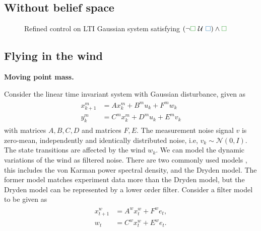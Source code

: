 \documentclass{ifacconf}
\newcommand{\red}[1]{{\color{red} #1}}
\begin{document}
\subsection{Without belief space}
\begin{figure}
	
	\caption{\red{Refined control on LTI Gaussian system satisfying $(\neg {\color{color2}\square } \Until {\color{color0}\square }) \wedge {\color{color2}\square } $ }}
\end{figure}
\subsection{Flying in the wind}
\noindent\textbf{Moving point mass.}
    
Consider the linear time invariant system with Gaussian disturbance, given as 
\begin{align}\begin{aligned}
	x^m_{k+1} &= A x^m_{k}+B^mu_{k}+ F^m w_{k}\\
	y^m_{k}&=C^m x^m_{k}+D^m u_{k}+E^m v_{k}\end{aligned}
\end{align}
with matrices $A,B,C,D$ and matrices $F,E$. 
The measurement noise signal $v$ is zero-mean, independently and identically  distributed noise, i.e, $v_k\sim \mathcal{N}(0,I)$.
The state transitions are affected by the wind $w_k$. 
We can model the dynamic variations of the wind as filtered noise. 
There are two commonly used models  \citep{richardson2013quantifying},  this includes the von Karman power spectral density,
and the Dryden model.
The former model matches experiment data more than the 
 Dryden model, but the Dryden model can be represented by  a lower order filter.
Consider a filter model to be given as
\begin{align}
	\begin{aligned}
	x_{t+1}^w &= A^w x_{t}^w+ F^w e_{t},\\
	w_{t}&=C^w x_{t}^w+E^w e_{t}.
	\end{aligned}
\end{align}
\end{document}
